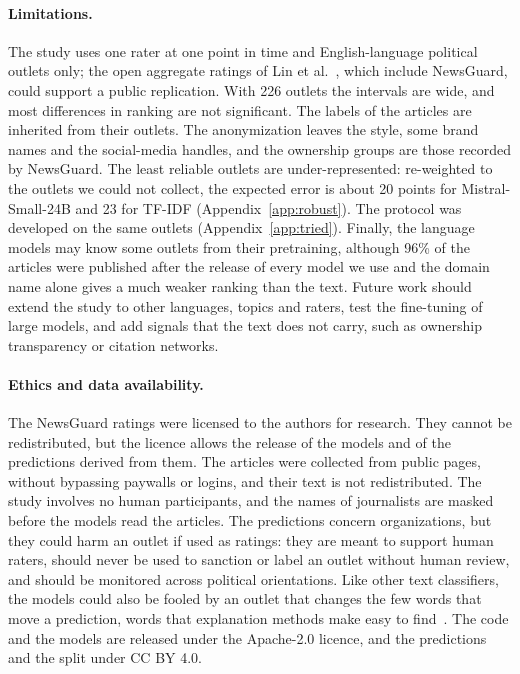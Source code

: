 \documentclass[11pt,a4paper]{article}
\begin{document}
\paragraph{Limitations.} The study uses one rater at one point in time and English-language political outlets only; the
open aggregate ratings of Lin et al.~\cite{lin2023high}, which include NewsGuard, could support a public replication.
With 226 outlets the intervals are wide, and most differences in ranking are not significant. The labels of the articles
are inherited from their outlets. The anonymization leaves the style, some brand names and the social-media handles, and
the ownership groups are those recorded by NewsGuard. The least reliable outlets are under-represented: re-weighted to
the outlets we could not collect, the expected error is about 20 points for Mistral-Small-24B and 23 for TF-IDF
(Appendix~\ref{app:robust}). The protocol was developed on the same outlets (Appendix~\ref{app:tried}). Finally, the
language models may know some outlets from their pretraining, although 96\% of the articles were published after the
release of every model we use and the domain name alone gives a much weaker ranking than the text. Future work should
extend the study to other languages, topics and raters, test the fine-tuning of large models, and add signals that the
text does not carry, such as ownership transparency or citation networks.

\paragraph{Ethics and data availability.}
The NewsGuard ratings were licensed to the authors for research. They cannot be redistributed, but the licence allows
the release of the models and of the predictions derived from them. The articles were collected from public pages,
without bypassing paywalls or logins, and their text is not redistributed. The study involves no human participants,
and the names of journalists are masked before the models read the articles. The predictions concern organizations, but
they could harm an outlet if used as ratings: they are meant to support human raters, should never be used to sanction
or label an outlet without human review, and should be monitored across political orientations. Like other text
classifiers, the models could also be fooled by an outlet that changes the few words that move a prediction, words that
explanation methods make easy to find~\cite{kozik2024explainability}. The code and the models are released under the
Apache-2.0 licence, and the predictions and the split under CC BY 4.0.
\end{document}
